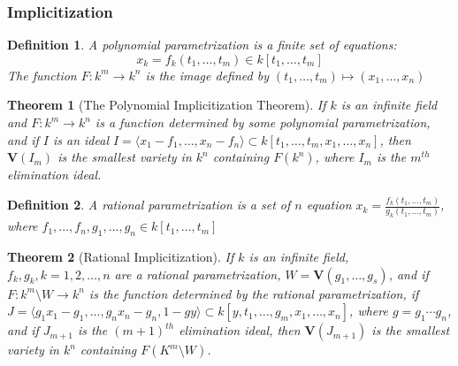 \documentclass[oneside]{book}
\theoremstyle{mystyle}
\newtheorem{theorem}{Theorem}[section]
\newtheorem{definition}{Definition}[section]
\begin{document}
\subsubsection{Implicitization}
\begin{definition}
A polynomial parametrization is a finite set of equations:
\begin{equation*}
    x_k = f_k(t_1,\hdots, t_m)\in k[t_1,\hdots, t_m]    
\end{equation*}
The function $F:k^m\rightarrow k^n$ is the image defined by $(t_1,\hdots, t_m)\mapsto (x_1,\hdots, x_n)$
\end{definition}
\begin{theorem}[The Polynomial Implicitization Theorem]
If $k$ is an infinite field and $F:k^m\rightarrow k^n$ is a function determined by some polynomial parametrization, and if $I$ is an ideal $I = \langle x_1-f_1,\hdots, x_n - f_n\rangle \subset k[t_1,\hdots, t_m, x_1,\hdots, x_n]$, then $\textbf{V}(I_m)$ is the smallest variety in $k^n$ containing $F(k^n)$, where $I_m$ is the $m^{th}$ elimination ideal.
\end{theorem}
\begin{definition}
A rational parametrization is a set of $n$ equation $x_k = \frac{f_k(t_1,\hdots, t_m)}{g_k(t_1,\hdots, t_m)}$, where $f_1,\hdots, f_n, g_1,\hdots, g_n\in k[t_1,\hdots, t_m]$
\end{definition}
\begin{theorem}[Rational Implicitization]
If $k$ is an infinite field, $f_k, g_k, k=1,2,\hdots, n$ are a rational parametrization, $W = \mathbf{V}(g_1,\hdots, g_s)$, and if $F:k^m\setminus W \rightarrow k^n$ is the function determined by the rational parametrization, if $J = \langle g_1 x_1 - g_1,\hdots, g_n x_n - g_n, 1-gy\rangle \subset k[y,t_1,\hdots, g_m, x_1,\hdots, x_n]$, where $g = g_1\cdots g_n$, and if $J_{m+1}$ is the $(m+1)^{th}$ elimination ideal, then $\textbf{V}(J_{m+1})$ is the smallest variety in $k^n$ containing $F(K^m\setminus W)$.
\end{theorem}
\end{document}
